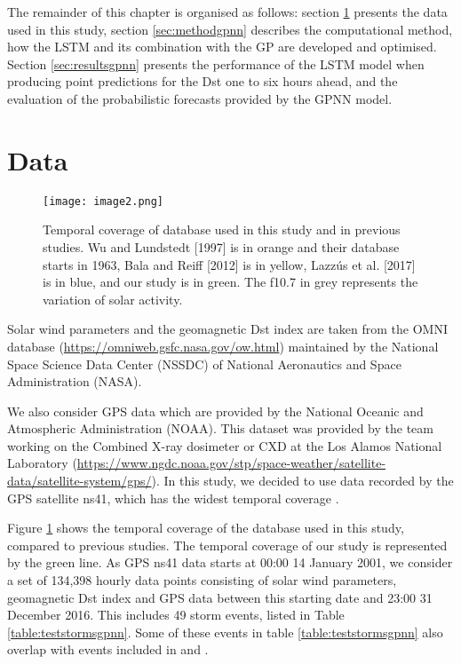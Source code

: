 The remainder of this chapter is organised as follows: section \ref{sec:data} presents the data used in this study, 
section \ref{sec:methodgpnn} describes the computational method, how the LSTM and its combination with the GP are 
developed and optimised. Section \ref{sec:resultsgpnn} presents the performance of the LSTM model when producing 
point predictions for the Dst one to six hours ahead, and the evaluation of the probabilistic forecasts provided 
by the GPNN model. 

\section{Data}\label{sec:data}

\begin{figure}
	\texttt{[image: image2.png]}
	\caption{Temporal coverage of database used in this study and in previous studies. Wu and Lundstedt [1997] is in orange and their database starts in 1963, Bala and Reiff [2012] is in yellow, Lazzús et al. [2017] is in blue, and our study is in green. The f10.7 in grey represents the variation of solar activity.}
	\label{fig:datacoverage}
\end{figure}


Solar wind parameters and the geomagnetic Dst index are taken from the OMNI database 
(\url{https://omniweb.gsfc.nasa.gov/ow.html}) maintained by the National Space Science Data Center (NSSDC) 
of National Aeronautics and Space Administration (NASA).

We also consider GPS data which are provided by the National Oceanic and Atmospheric Administration (NOAA). 
This dataset was provided by the team working on the Combined X-ray dosimeter or CXD at the 
Los Alamos National Laboratory (\url{https://www.ngdc.noaa.gov/stp/space-weather/satellite-data/satellite-system/gps/}). 
In this study, we decided to use data recorded by the GPS satellite ns41, which has the widest temporal coverage 
\citep{morley2017energetic}. 

Figure \ref{fig:datacoverage} shows the temporal coverage of the database used in this study, compared to 
previous studies. The temporal coverage of our study is represented by the green line. As GPS ns41 data 
starts at 00:00 14 January 2001, we consider a set of 134,398 hourly data points consisting of 
solar wind parameters, geomagnetic Dst index and GPS data between this starting date and 23:00 31 December 2016. 
This includes 49 storm events, listed in Table \ref{table:teststormsgpnn}. Some of these events in table 
\ref{table:teststormsgpnn} also overlap with events included in \citet{Ji2012} and \citet{ChandorkarDst}. 

